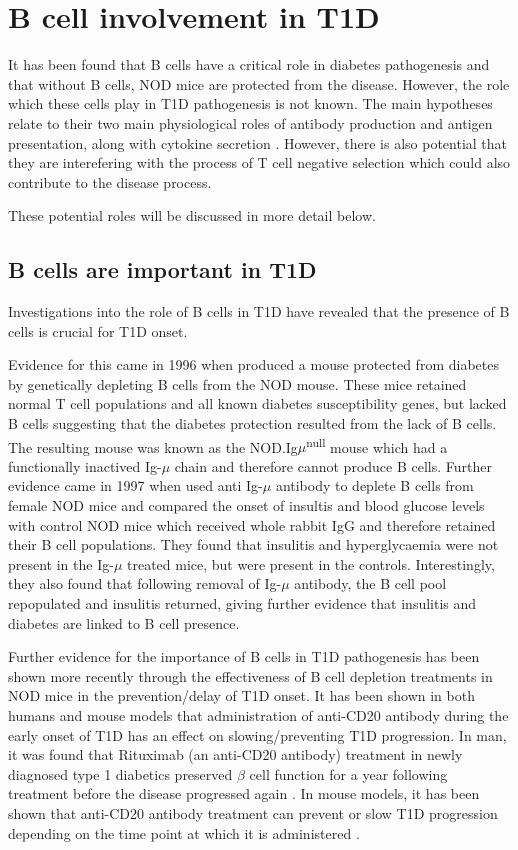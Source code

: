 \section{B cell involvement in T1D}
\label{sec:BcellsinT1D}

It has been found that B cells have a critical role in diabetes pathogenesis and that without B cells, NOD mice are protected from the disease.
However, the role which these cells play in T1D pathogenesis is not known.
The main hypotheses relate to their two main physiological roles of antibody production and antigen presentation, along with cytokine secretion \citep{Hinman2014}.
However, there is also potential that they are interefering with the process of T cell negative selection which could also contribute to the disease process.

These potential roles will be discussed in more detail below.

\subsection{B cells are important in T1D}

Investigations into the role of B cells in T1D have revealed that the presence of B cells is crucial for T1D onset.

Evidence for this came in 1996 when \citet{Serreze1996} produced a mouse protected from diabetes by genetically depleting B cells from the NOD mouse.
These mice retained normal T cell populations and all known diabetes susceptibility genes, but lacked B cells suggesting that the diabetes protection resulted from the lack of B cells.
The resulting mouse was known as the NOD.Ig$\mu$\textsuperscript{null} mouse which had a functionally inactived Ig-$\mu$ chain and therefore cannot produce B cells.
Further evidence came in 1997 when \citet{Noorchashm1997} used anti Ig-$\mu$ antibody to deplete B cells from female NOD mice and compared the onset of insultis and blood glucose levels with control NOD mice which received whole rabbit IgG and therefore retained their B cell populations.
They found that insulitis and hyperglycaemia were not present in the Ig-$\mu$ treated mice, but were present in the controls.
Interestingly, they also found that following removal of Ig-$\mu$ antibody, the B cell pool repopulated and insulitis returned, giving further evidence that insulitis and diabetes are linked to B cell presence.

Further evidence for the importance of B cells in T1D pathogenesis has been shown more recently through the effectiveness of B cell depletion treatments in NOD mice in the prevention/delay of T1D onset.
It has been shown in both humans and mouse models that administration of anti-CD20 antibody during the early onset of T1D has an effect on slowing/preventing T1D progression.
In man, it was found that Rituximab (an anti-CD20 antibody) treatment in newly diagnosed type 1 diabetics preserved $\beta$ cell function for a year following treatment before the disease progressed again \citep{Pescovitz2009}.
In mouse models, it has been shown that anti-CD20 antibody treatment can prevent or slow T1D progression depending on the time point at which it is administered \citep{Xiu2008}.

